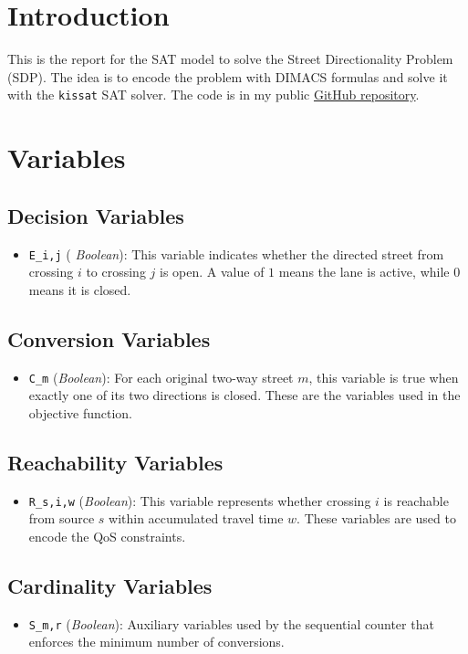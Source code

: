 \section*{Introduction}
This is the report for the SAT model to solve the Street Directionality Problem (SDP).
The idea is to encode the problem with DIMACS formulas and solve it with the \texttt{kissat} SAT solver.
The code is in my public \href{https://github.com/channelEs/CPS_MIRI}{GitHub repository}.
\section*{Variables}

\subsection*{Decision Variables}
\begin{itemize}
    \item \texttt{E\_{i,j}} (
    \textit{Boolean}):
    This variable indicates whether the directed street from crossing $i$ to crossing $j$ is open.
    A value of $1$ means the lane is active, while $0$ means it is closed.
\end{itemize}

\subsection*{Conversion Variables}
\begin{itemize}
    \item \texttt{C\_m} (\textit{Boolean}):
    For each original two-way street $m$, this variable is true when exactly one of its two directions is closed.
    These are the variables used in the objective function.
\end{itemize}

\subsection*{Reachability Variables}
\begin{itemize}
    \item \texttt{R\_{s,i,w}} (\textit{Boolean}):
    This variable represents whether crossing $i$ is reachable from source $s$ within accumulated travel time $w$.
    These variables are used to encode the QoS constraints.
\end{itemize}

\subsection*{Cardinality Variables}
\begin{itemize}
    \item \texttt{S\_{m,r}} (\textit{Boolean}):
    Auxiliary variables used by the sequential counter that enforces the minimum number of conversions.
\end{itemize}

